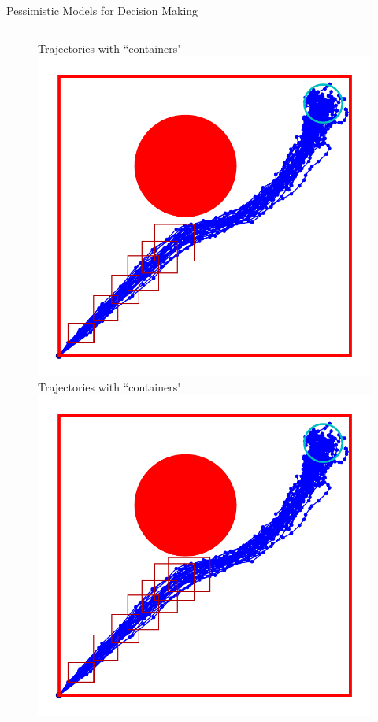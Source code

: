 \documentclass[lecture]{beamer}
\begin{document}
\begin{frame}{\normalsize Pessimistic Models for Decision Making}
\begin{columns}[t]
\begin{overlayarea}{\textwidth}{1\textheight}
\begin{figure}
{        }%
        {%
                \center
        Trajectories with ``containers"
   \includegraphics[width=\FS\textwidth]{Codes/BasicsSafety/PessimisticModel6.pdf}%
        }%
        {%
                \center
        Trajectories with ``containers"
  \includegraphics[width=\FS\textwidth]{Codes/BasicsSafety/PessimisticModel7.pdf}%
}
\end{figure}
\end{overlayarea}
\end{columns}
\end{frame}
\end{document}
